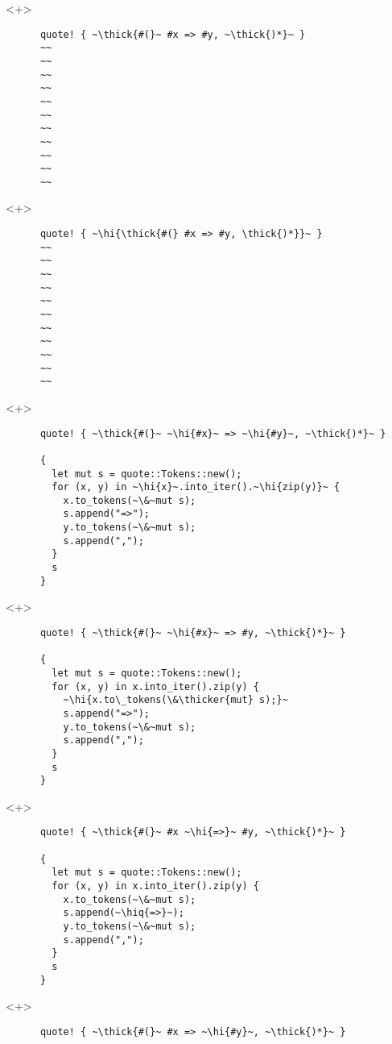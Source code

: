 \documentclass[usepdftitle=false]{beamer}
\renewcommand{\&}{\makebox[\widthof{\ampersand}][c]{\scalebox{0.9}[1.0]{\Book\ampersand}}}
\newcommand{\+}{\makebox[\widthof{+}][c]{\raisebox{-.2\height}{\scalefont{1.5}\Light+}}}
\newcommand{\thick}[1]{\contourlength{0.12pt}\contour[10]{black}{#1}}
\newcommand{\thicker}[1]{\contourlength{0.26pt}\contour[10]{black}{#1}}
\newcommand{\hi}[1]{%
\tikz[baseline=(A.base)]
 \node[highlighting=0,inner sep=0pt,text depth=0pt] (A) {#1};%
}
\newcommand{\hiq}[1]{\hi{''#1''}}
\begin{document}
\begin{frame}[fragile]
  \begin{onlyenv}<+>
    \begin{verbatim}
      quote! { ~\thick{#(}~ #x => #y, ~\thick{)*}~ }
      ~~
      ~~
      ~~
      ~~
      ~~
      ~~
      ~~
      ~~
      ~~
      ~~
      ~~
    \end{verbatim}
  \end{onlyenv}
  \begin{onlyenv}<+>
    \begin{verbatim}
      quote! { ~\hi{\thick{#(} #x => #y, \thick{)*}}~ }
      ~~
      ~~
      ~~
      ~~
      ~~
      ~~
      ~~
      ~~
      ~~
      ~~
      ~~
    \end{verbatim}
  \end{onlyenv}
  \begin{onlyenv}<+>
    \begin{verbatim}
      quote! { ~\thick{#(}~ ~\hi{#x}~ => ~\hi{#y}~, ~\thick{)*}~ }

      {
        let mut s = quote::Tokens::new();
        for (x, y) in ~\hi{x}~.into_iter().~\hi{zip(y)}~ {
          x.to_tokens(~\&~mut s);
          s.append("=>");
          y.to_tokens(~\&~mut s);
          s.append(",");
        }
        s
      }
    \end{verbatim}
  \end{onlyenv}
  \begin{onlyenv}<+>
    \begin{verbatim}
      quote! { ~\thick{#(}~ ~\hi{#x}~ => #y, ~\thick{)*}~ }

      {
        let mut s = quote::Tokens::new();
        for (x, y) in x.into_iter().zip(y) {
          ~\hi{x.to\_tokens(\&\thicker{mut} s);}~
          s.append("=>");
          y.to_tokens(~\&~mut s);
          s.append(",");
        }
        s
      }
    \end{verbatim}
  \end{onlyenv}
  \begin{onlyenv}<+>
    \begin{verbatim}
      quote! { ~\thick{#(}~ #x ~\hi{=>}~ #y, ~\thick{)*}~ }

      {
        let mut s = quote::Tokens::new();
        for (x, y) in x.into_iter().zip(y) {
          x.to_tokens(~\&~mut s);
          s.append(~\hiq{=>}~);
          y.to_tokens(~\&~mut s);
          s.append(",");
        }
        s
      }
    \end{verbatim}
  \end{onlyenv}
  \begin{onlyenv}<+>
    \begin{verbatim}
      quote! { ~\thick{#(}~ #x => ~\hi{#y}~, ~\thick{)*}~ }


\end{verbatim}
\end{onlyenv}
\end{frame}
\end{document}
